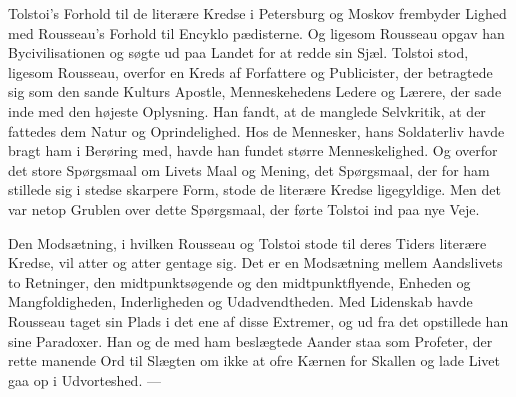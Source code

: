 \documentclass[12pt,a4paper,openany]{book}
\newcommand{\opage}[1]{\marginnote{\footnotesize\textit{[#1]}}}
\begin{document}
Tolstoi’s Forhold til de literære Kredse i Petersburg og
Moskov frembyder Lighed med Rousseau’s Forhold til Encyklo%
\setcounter{footnote}{0}%
\opage{129}pædisterne. Og ligesom Rousseau opgav han Bycivilisationen og
søgte ud paa Landet for at redde sin Sjæl. Tolstoi stod, ligesom
Rousseau, overfor en Kreds af Forfattere og Publicister, der betragtede
sig som den sande Kulturs Apostle, Menneskehedens
Ledere og Lærere, der sade inde med den højeste Oplysning.
Han fandt, at de manglede Selvkritik, at der fattedes dem Natur
og Oprindelighed. Hos de Mennesker, hans Soldaterliv havde
bragt ham i Berøring med, havde han fundet større Menneskelighed.
Og overfor det store Spørgsmaal om Livets Maal og
Mening, det Spørgsmaal, der for ham stillede sig i stedse skarpere
Form, stode de literære Kredse ligegyldige. Men det var
netop Grublen over dette Spørgsmaal, der førte Tolstoi ind paa
nye Veje.

Den Modsætning, i hvilken Rousseau og Tolstoi stode til
deres Tiders literære Kredse, vil atter og atter gentage sig. Det
er en Modsætning mellem Aandslivets to Retninger, den midtpunktsøgende
og den midtpunktflyende, Enheden og Mangfoldigheden,
Inderligheden og Udadvendtheden. Med Lidenskab havde
Rousseau taget sin Plads i det ene af disse Extremer, og ud fra
det opstillede han sine Paradoxer. Han og de med ham beslægtede
Aander staa som Profeter, der rette manende Ord til
Slægten om ikke at ofre Kærnen for Skallen og lade Livet gaa
op i Udvorteshed. ---
\end{document}
